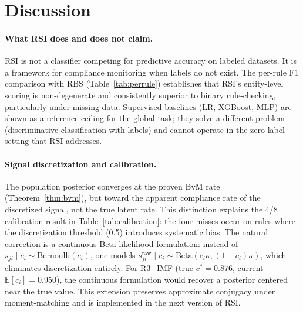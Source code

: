 \documentclass[letterpaper]{article}
\begin{document}
\section{Discussion}
\label{sec:discussion}

\paragraph{What RSI does and does not claim.}
RSI is not a classifier competing for predictive accuracy on labeled
datasets. It is a framework for compliance monitoring when labels do
not exist. The per-rule F1 comparison with RBS (Table~\ref{tab:perrule})
establishes that RSI's entity-level scoring is non-degenerate and
consistently superior to binary rule-checking, particularly
under missing data. Supervised baselines (LR, XGBoost, MLP) are shown as
a reference ceiling for the global task; they solve a different problem
(discriminative classification with labels) and cannot operate in the
zero-label setting that RSI addresses.

\paragraph{Signal discretization and calibration.}
The population posterior converges at the proven BvM rate
(Theorem~\ref{thm:bvm}), but toward the apparent compliance rate of
the discretized signal, not the true latent rate. This distinction
explains the 4/8 calibration result in Table~\ref{tab:calibration}:
the four misses occur on rules where the discretization threshold
(0.5) introduces systematic bias. The natural correction is a
continuous Beta-likelihood formulation: instead of
$s_{ji} \mid c_i \sim \mathrm{Bernoulli}(c_i)$, one models
$s_{ji}^{\mathrm{raw}} \mid c_i \sim \mathrm{Beta}(c_i \kappa,
(1{-}c_i)\kappa)$, which eliminates discretization entirely. For
R3\_IMF (true $c^* = 0.876$, current $\mathbb{E}[c_i] = 0.950$),
the continuous formulation would recover a posterior centered near
the true value. This extension preserves approximate conjugacy under
moment-matching and is implemented in the next version of RSI.
\end{document}
